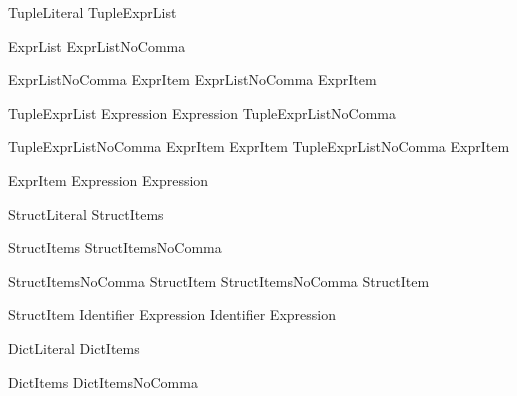 \begin{bnf}{TupleLiteral}
    \terminal{(} TupleExprList\bnfq \terminal{)}
\end{bnf}

\begin{bnf}{ExprList}
    ExprListNoComma \terminal{,}\bnfq
\end{bnf}

\begin{bnf}{ExprListNoComma}
    ExprItem \br
    ExprListNoComma \terminal{,} ExprItem
\end{bnf}

\begin{bnf}{TupleExprList}
    Expression \terminal{,} \br
     Expression \terminal{,}\bnfq \br
    TupleExprListNoComma \terminal{,}\bnfq
\end{bnf}

\begin{bnf}{TupleExprListNoComma}
    ExprItem \terminal{,} ExprItem \br
    TupleExprListNoComma \terminal{,} ExprItem
\end{bnf}

\begin{bnf}{ExprItem}
    Expression \br
     Expression
\end{bnf}

\begin{bnf}{StructLiteral}
    \terminal{\{} StructItems\bnfq \terminal{\}}
\end{bnf}

\begin{bnf}{StructItems}
    StructItemsNoComma \terminal{,}\bnfq
\end{bnf}

\begin{bnf}{StructItemsNoComma}
    StructItem \br
    StructItemsNoComma \terminal{,} StructItem
\end{bnf}

\begin{bnf}{StructItem}
    Identifier \terminal{:} Expression \br
    Identifier \br
     Expression
\end{bnf}

\begin{bnf}{DictLiteral}
    \terminal{[} DictItems \terminal{]} \br
    \terminal{[} \terminal{:} \terminal{]}
\end{bnf}

\begin{bnf}{DictItems}
    DictItemsNoComma \terminal{,}\bnfq
\end{bnf}

